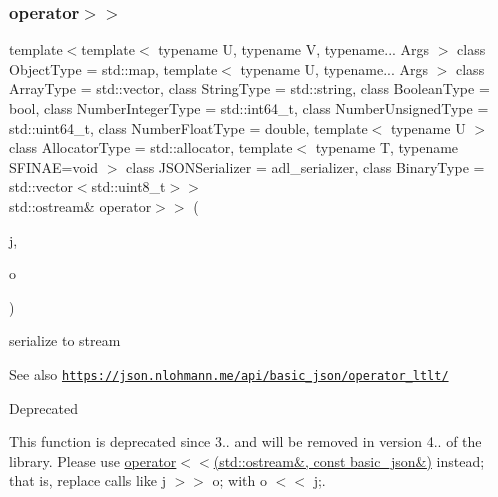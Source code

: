 \subsubsection{\texorpdfstring{operator$>$$>$}{operator>>}\hspace{0.1cm}{\footnotesize\ttfamily [1/2]}}
{\footnotesize\ttfamily template$<$template$<$ typename U, typename V, typename... Args $>$ class Object\+Type = std\+::map, template$<$ typename U, typename... Args $>$ class Array\+Type = std\+::vector, class String\+Type  = std\+::string, class Boolean\+Type  = bool, class Number\+Integer\+Type  = std\+::int64\+\_\+t, class Number\+Unsigned\+Type  = std\+::uint64\+\_\+t, class Number\+Float\+Type  = double, template$<$ typename U $>$ class Allocator\+Type = std\+::allocator, template$<$ typename T, typename S\+F\+I\+N\+A\+E=void $>$ class J\+S\+O\+N\+Serializer = adl\+\_\+serializer, class Binary\+Type  = std\+::vector$<$std\+::uint8\+\_\+t$>$$>$ \\
std\+::ostream\& operator$>$$>$ (\begin{DoxyParamCaption}\item[{const \hyperlink{classnlohmann_1_1basic__json}{basic\+\_\+json}$<$ Object\+Type, Array\+Type, String\+Type, Boolean\+Type, Number\+Integer\+Type, Number\+Unsigned\+Type, Number\+Float\+Type, Allocator\+Type, J\+S\+O\+N\+Serializer, Binary\+Type $>$ \&}]{j,  }\item[{std\+::ostream \&}]{o }\end{DoxyParamCaption})\hspace{0.3cm}{\ttfamily [friend]}}



serialize to stream 

\begin{DoxySeeAlso}{See also}
\href{https://json.nlohmann.me/api/basic_json/operator_ltlt/}{\tt https\+://json.\+nlohmann.\+me/api/basic\+\_\+json/operator\+\_\+ltlt/} 
\end{DoxySeeAlso}
\begin{DoxyRefDesc}{Deprecated}
\item[\hyperlink{deprecated__deprecated000003}{Deprecated}]This function is deprecated since 3.. and will be removed in version 4.. of the library. Please use \hyperlink{classnlohmann_1_1basic__json_a5e34c5435e557d0bf666bd7311211405}{operator$<$$<$(std\+::ostream\&, const basic\+\_\+json\&)} instead; that is, replace calls like {\ttfamily j $>$$>$ o;} with {\ttfamily o $<$$<$ j;}. \end{DoxyRefDesc}
\mbox{\label{classnlohmann_1_1basic__json_aaf363408931d76472ded14017e59c9e8}} 
